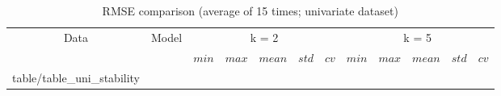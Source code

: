 \documentclass[review,3p,authoryear]{elsarticle}
\makeatletter
\newcommand\primitiveinput[1]
		{\@@input #1 }
\makeatother
\begin{document}
{%

\begin{table}[h]
	\caption{RMSE comparison (average of 15 times; univariate dataset)}
	\label{table:uni_stability}
	\centering
	\begin{adjustbox}{width=\textwidth}
		\begin{tabular}{| c | c| c | c | c | c | c | c | c | c | c | c |}%
		\hline
			 \multirow{2}{*}{Data} & \multirow{2}{*}{Model} & \multicolumn{5}{c|}{k = 2} & \multicolumn{5}{c|}{ k = 5 } \\ 
			 \cline{3-12}
	   		& & $min$ & $max$ & $mean$ & $std$ & $cv$ &   $min$ & $max$ & $mean$ & $std$ & $cv$ \\ [0.5ex] 
		\hline
			\primitiveinput{table/table_uni_stability}
		\hline
		\end{tabular}
	\end{adjustbox}
\end{table}






}
\end{document}
